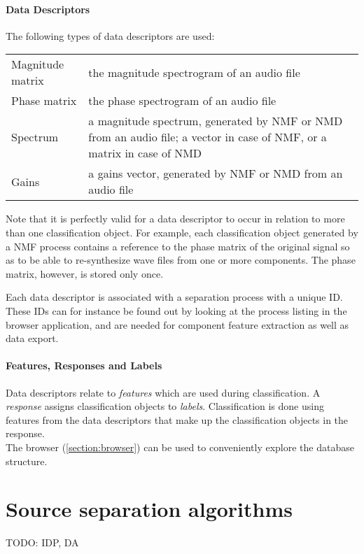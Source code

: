 \paragraph{Data Descriptors} The following types of data descriptors are used:
\begin{center}
  \begin{tabular}{|p{}|p{}|}
    \hline
    Magnitude matrix & the magnitude spectrogram of an audio file \\
    Phase matrix & the phase spectrogram of an audio file \\
    Spectrum & a magnitude spectrum, generated by NMF or NMD from an audio file; a vector in case of NMF, or a matrix in case of NMD \\
    Gains & a gains vector, generated by NMF or NMD from an audio file \\
    \hline
  \end{tabular}
\end{center}
Note that it is perfectly valid for a data descriptor to occur in relation to
more than one classification object. For example, each classification object
generated by a NMF process contains a reference to the phase matrix of the
original signal so as to be able to re-synthesize wave files from one or more
components. The phase matrix, however, is stored only once.

Each data descriptor is associated with a separation process with a unique ID.
These IDs can for instance be found out by looking at the process listing in
the browser application, and are needed for component feature extraction
as well as data export.

\paragraph{Features, Responses and Labels} Data descriptors relate to
\emph{features} which are used during classification. A \emph{response} assigns
classification objects to \emph{labels}. Classification is done using features
from the data descriptors that make up the classification objects in the
response.\\

\noindent The browser (\ref{section:browser}) can be used to conveniently
explore the database structure.



\section{Source separation algorithms}

TODO: IDP, DA